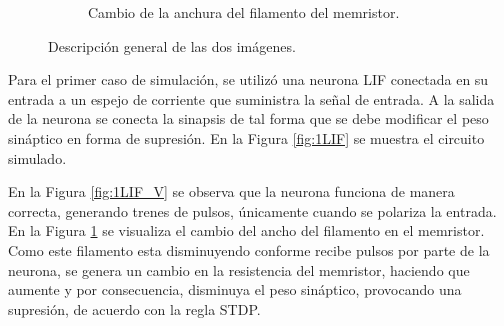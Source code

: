 \documentclass[conference]{IEEEtran}
\begin{document}
\begin{figure}[htbp]
\begin{subfigure}[b]{0.45\textwidth}
        \caption{Cambio de la anchura del filamento del memristor.}
        \label{fig:1LIF_T}
    \end{subfigure}
    \caption{Descripción general de las dos imágenes.}
    \label{fig:LIF1}
\end{figure}

Para el primer caso de simulación, se utilizó una neurona LIF conectada en su entrada a un espejo de corriente que suministra la señal de entrada. A la salida de la neurona se conecta la sinapsis de tal forma que se debe modificar el peso sináptico en forma de supresión. En la Figura \ref{fig:1LIF} se muestra el circuito simulado.

En la Figura \ref{fig:1LIF_V} se observa que la neurona funciona de manera correcta, generando trenes de pulsos, únicamente cuando se polariza la entrada. En la Figura \ref{fig:1LIF_T} se visualiza el cambio del ancho del filamento en el memristor. Como este filamento esta disminuyendo conforme recibe pulsos por parte de la neurona, se genera un cambio en la resistencia del memristor, haciendo que aumente y por consecuencia, disminuya el peso sináptico, provocando una supresión, de acuerdo con la regla STDP.
\end{document}
